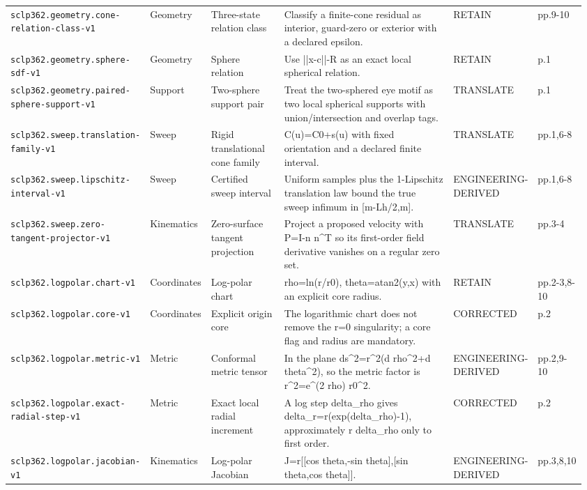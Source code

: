 \begin{landscape}
\begin{longtable}{p{0.19\linewidth} p{0.08\linewidth} p{0.15\linewidth} p{0.37\linewidth} p{0.10\linewidth} p{0.07\linewidth}}
\texttt{sclp362.geometry.cone-relation-class-v1} & Geometry & Three-state relation class & Classify a finite-cone residual as interior, guard-zero or exterior with a declared epsilon. & RETAIN & pp.9-10\\
\texttt{sclp362.geometry.sphere-sdf-v1} & Geometry & Sphere relation & Use ||x-c||-R as an exact local spherical relation. & RETAIN & p.1\\
\texttt{sclp362.geometry.paired-sphere-support-v1} & Support & Two-sphere support pair & Treat the two-sphered eye motif as two local spherical supports with union/intersection and overlap tags. & TRANSLATE & p.1\\
\texttt{sclp362.sweep.translation-family-v1} & Sweep & Rigid translational cone family & C(u)=C0+s(u) with fixed orientation and a declared finite interval. & TRANSLATE & pp.1,6-8\\
\texttt{sclp362.sweep.lipschitz-interval-v1} & Sweep & Certified sweep interval & Uniform samples plus the 1-Lipschitz translation law bound the true sweep infimum in [m-Lh/2,m]. & ENGINEERING-DERIVED & pp.1,6-8\\
\texttt{sclp362.sweep.zero-tangent-projector-v1} & Kinematics & Zero-surface tangent projection & Project a proposed velocity with P=I-n n\textasciicircum{}T so its first-order field derivative vanishes on a regular zero set. & TRANSLATE & pp.3-4\\
\texttt{sclp362.logpolar.chart-v1} & Coordinates & Log-polar chart & rho=ln(r/r0), theta=atan2(y,x) with an explicit core radius. & RETAIN & pp.2-3,8-10\\
\texttt{sclp362.logpolar.core-v1} & Coordinates & Explicit origin core & The logarithmic chart does not remove the r=0 singularity; a core flag and radius are mandatory. & CORRECTED & p.2\\
\texttt{sclp362.logpolar.metric-v1} & Metric & Conformal metric tensor & In the plane ds\textasciicircum{}2=r\textasciicircum{}2(d rho\textasciicircum{}2+d theta\textasciicircum{}2), so the metric factor is r\textasciicircum{}2=e\textasciicircum{}(2 rho) r0\textasciicircum{}2. & ENGINEERING-DERIVED & pp.2,9-10\\
\texttt{sclp362.logpolar.exact-radial-step-v1} & Metric & Exact local radial increment & A log step delta\_rho gives delta\_r=r(exp(delta\_rho)-1), approximately r delta\_rho only to first order. & CORRECTED & p.2\\
\texttt{sclp362.logpolar.jacobian-v1} & Kinematics & Log-polar Jacobian & J=r[[cos theta,-sin theta],[sin theta,cos theta]]. & ENGINEERING-DERIVED & pp.3,8,10\\

\end{longtable}
\end{landscape}
